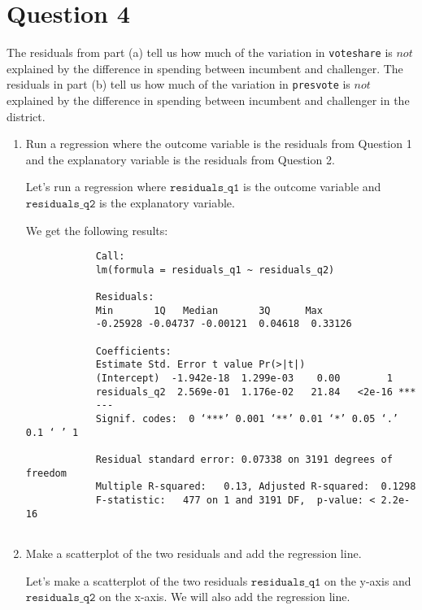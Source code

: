 \documentclass[12pt,letterpaper]{article}
\begin{document}
\newpage	
\section*{Question 4}
\noindent The residuals from part (a) tell us how much of the variation in \texttt{voteshare} is $not$ explained by the difference in spending between incumbent and challenger. The residuals in part (b) tell us how much of the variation in \texttt{presvote} is $not$ explained by the difference in spending between incumbent and challenger in the district.
	\begin{enumerate}
		\item Run a regression where the outcome variable is the residuals from Question 1 and the explanatory variable is the residuals from Question 2.	
		
		Let's run a regression where  \(\texttt{residuals\_q1}\) is the outcome variable and \(\texttt{residuals\_q2}\) is the explanatory variable.
		
		
		
		We get the following results:
		
		\begin{verbatim}
			Call:
			lm(formula = residuals_q1 ~ residuals_q2)
			
			Residuals:
			Min       1Q   Median       3Q      Max 
			-0.25928 -0.04737 -0.00121  0.04618  0.33126 
			
			Coefficients:
			Estimate Std. Error t value Pr(>|t|)    
			(Intercept)  -1.942e-18  1.299e-03    0.00        1    
			residuals_q2  2.569e-01  1.176e-02   21.84   <2e-16 ***
			---
			Signif. codes:  0 ‘***’ 0.001 ‘**’ 0.01 ‘*’ 0.05 ‘.’ 0.1 ‘ ’ 1
			
			Residual standard error: 0.07338 on 3191 degrees of freedom
			Multiple R-squared:   0.13,	Adjusted R-squared:  0.1298 
			F-statistic:   477 on 1 and 3191 DF,  p-value: < 2.2e-16
			
		\end{verbatim}
		
		\vspace{6cm}
		\item Make a scatterplot of the two residuals and add the regression line. 	
		
		Let's make a scatterplot of the two residuals \(\texttt{residuals\_q1}\) on the y-axis and \(\texttt{residuals\_q2}\) on the x-axis. We will also add the regression line. \\
		

\end{enumerate}
\end{document}
